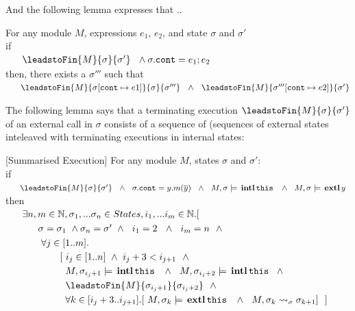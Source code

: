 And the following lemma expresses that ..

\begin{lemma}
\label{lemma:subexp}
For any module $M$, expressions $e_1$, $e_2$, and state $\sigma$ and $\sigma'$
\\
if \\
$\strut \ \ \ \ \ \leadstoFin {M} {\sigma} {\sigma'} \ \ \wedge \sigma.\texttt{cont} = e_1; e_2$
\\
then, there exists a $\sigma'''$ such that\\
%
$\strut \ \ \ \ \ \leadstoFin {M} {\sigma[\texttt{cont}\mapsto e1]} {\sigma} {\sigma'''} \ \ \wedge \ \ %
\leadstoFin {M} {\sigma'''[\texttt{cont}\mapsto e2]}   {\sigma'} $
\end{lemma}
 

 The following lemma says that a terminating execution $\leadstoFin {M} {\sigma} {\sigma'}$ of an external call in $\sigma$ consists of a sequence of (sequences of external states inteleaved with terminating executions in internal states:
 
\begin{lemma}
\label{lemma:external_breakdown}[Summarised Execution]
For any module $M$,  states $\sigma$ and $\sigma'$:
\\
if \\
$\strut \ \ \ \ \ \leadstoFin {M} {\sigma} {\sigma'}  \ \ \wedge\ \ \sigma.\texttt{cont} = y.m(\overline y) \ \ \wedge  \ \ M,\sigma \models \internal {\texttt{this}}\ \ \wedge \ \ M,\sigma \models \external y\ $
\\
then
\\
$\strut \ \ \ \ \ \exists n,m\in \mathbb{N}, \sigma_1, ... \sigma_n \in States, i_1,...i_m \in \mathbb{N}. [$\\
$\strut \ \ \ \ \ \ \ \ \ \ \sigma=\sigma_1  \ \wedge  \sigma_n=\sigma'\ \wedge\ \  i_1=2 \ \ \wedge\ \   i_m=n\ \ \wedge$\\
$\strut \ \ \ \ \ \ \ \ \ \ \ \forall j\in [1..m].$\\
$\strut \ \ \ \ \ \ \ \ \ \ \hspace{.8cm}[ \ i_j \in [1..n]\  \wedge \ i_{j}+3  < i_{j+1} \ \ \wedge$\\
$\strut \ \ \ \ \ \ \ \ \ \ \hspace{1cm} M, \sigma_{i_j+1} \models {\ensuremath{\, \mathbf{intl}}\, \texttt{this}\, }  \ \ \wedge \ \ M, \sigma_{i_j+2} \models {\ensuremath{\, \mathbf{intl}}\, \texttt{this}\, }  \ \ \wedge$\\
$\strut \ \ \ \ \ \ \ \ \ \ \hspace{1cm}  \leadstoFin {M} {\sigma_{i_j+1}} {\sigma_{i_j+2}}\ \ \wedge $\\
$\strut \ \ \ \ \ \ \ \ \ \ \hspace{1cm} \forall k\in [i_j+3..i_{j+1}]. [\ M, \sigma_k \models {\ensuremath{\, \mathbf{extl}}\, \texttt{this}\, }  \ \ \wedge \ \ M, \sigma_{k} \leadsto_{\sigma} \sigma_{k+1}] \ \ ]$
\end{lemma}

